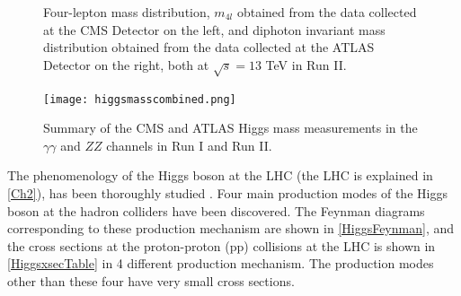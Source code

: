 \begin{figure}[ht]
\begin{subfigure}[b]{0.475\textwidth}
            \vspace{-0.5cm}
        \end{subfigure}
        \caption[Four-lepton mass distribution, $m_{4l}$ obtained from the data collected at the CMS Detector on the left, and diphoton invariant mass distribution obtained from the data collected at the ATLAS Detector on the right, both at $\sqrt{s}=13$ TeV in Run II.]
        {\small Four-lepton mass distribution, $m_{4l}$ obtained from the data collected at the CMS Detector\cite{cms-higgs-13tev} on the left, and diphoton invariant mass distribution obtained from the data collected at the ATLAS Detector\cite{atlas-higgs-13tev} on the right, both at $\sqrt{s}=13$ TeV in Run II.} 
        \label{higgs-13tev}
\end{figure}

\begin{figure}[ht]
	\centering
	\texttt{[image: higgsmasscombined.png]}
	\caption[Summary of the CMS and ATLAS Higgs mass measurements in the $\gamma\gamma$ and $ZZ$ channels in Run I and Run II.]{Summary of the CMS and ATLAS Higgs mass measurements in the $\gamma\gamma$ and $ZZ$ channels in Run I and Run II\cite{pdg}.}
	\label{higgsmasssummary}
\end{figure}

The phenomenology of the Higgs boson at the LHC (the LHC is explained in \autoref{Ch2}), has been thoroughly studied \cite{higg-phen-1,higg-phen-2,higg-phen-3}. Four main production modes of the Higgs boson at the hadron colliders have been discovered. The Feynman diagrams corresponding to these production mechanism are shown in \autoref{HiggsFeynman}, and the cross sections at the proton-proton (pp) collisions at the LHC is shown in \autoref{HiggsxsecTable} in 4 different production mechanism. The production modes other than these four have very small cross sections.

